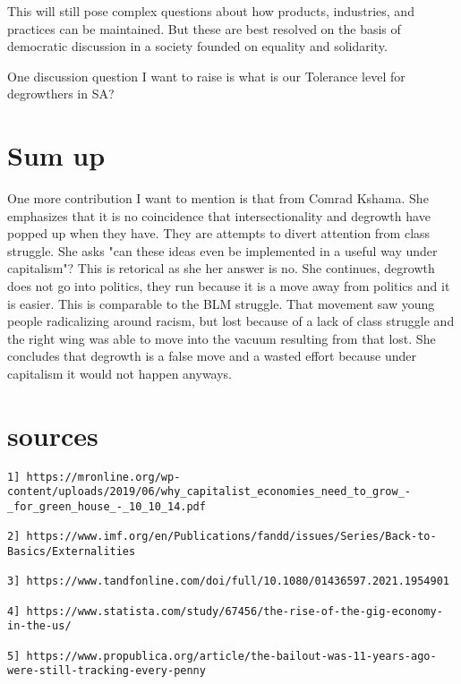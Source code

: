 \documentclass{article}
\begin{document}
This will still pose complex questions about how products, industries, and practices can be maintained. But these are best resolved on the basis of democratic discussion in a society founded on equality and solidarity.

One discussion question I want to raise is what is our Tolerance level for degrowthers in SA?

\section{Sum up}
One more contribution I want to mention is that from Comrad Kshama. She emphasizes that it is no coincidence that intersectionality and degrowth have popped up when they have. They are attempts to divert attention from class struggle. She asks "can these ideas even be implemented in a useful way under capitalism"? This is retorical as she her answer is no. She continues, degrowth does not go into politics, they run because it is a move away from politics and it is easier. This is comparable to the BLM struggle. That movement saw young people radicalizing around racism, but lost because of a lack of class struggle and the right wing was able to move into the vacuum resulting from that lost. She concludes that degrowth is a false move and a wasted effort because under capitalism it would not happen anyways.

\section{sources}
\begin{verbatim}
1] https://mronline.org/wp-content/uploads/2019/06/why_capitalist_economies_need_to_grow_-_for_green_house_-_10_10_14.pdf

2] https://www.imf.org/en/Publications/fandd/issues/Series/Back-to-Basics/Externalities

3] https://www.tandfonline.com/doi/full/10.1080/01436597.2021.1954901

4] https://www.statista.com/study/67456/the-rise-of-the-gig-economy-in-the-us/

5] https://www.propublica.org/article/the-bailout-was-11-years-ago-were-still-tracking-every-penny
\end{verbatim}
\end{document}
